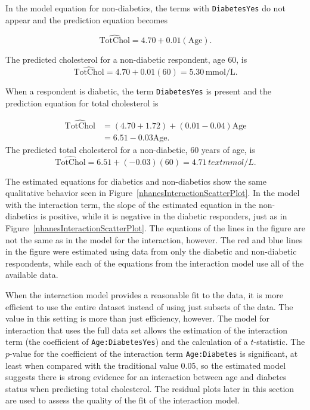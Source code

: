 In the model equation for non-diabetics, the terms with \texttt{DiabetesYes} do not appear and the prediction equation becomes 

\[\widehat{\text{TotChol}} = 4.70 + 0.01(\text{Age}).  \]

The predicted cholesterol for a non-diabetic respondent, age 60, is 
\[\widehat{\text{TotChol}} = 4.70 + 0.01(60) = 5.30\,\text{mmol/L}.  \]

When a respondent is diabetic, the term \texttt{DiabetesYes} is present and the prediction equation for total cholesterol is

\begin{align*}
\widehat{\text{TotChol}} &= (4.70 + 1.72) + (0.01 - 0.04)\text{Age} \\
&= 6.51 - 0.03\text{Age}.
\end{align*}
The predicted total cholesterol for a non-diabetic, 60 years of age, is 
\[\widehat{\text{TotChol}} = 6.51 + (-0.03)(60) = 4.71\, text{mmol/L}.  \]

The estimated equations for diabetics and non-diabetics show the same qualitative behavior seen in Figure~\ref{nhanesInteractionScatterPlot}.  In the model with the interaction term, the slope of the estimated equation in the non-diabetics is positive, while it is negative in the diabetic responders, just as in Figure~\ref{nhanesInteractionScatterPlot}.  The equations of the lines in the figure are not the same as in the model for the interaction, however.  The red and blue lines in the figure were estimated using data from only the diabetic and non-diabetic respondents, while each of the equations from the interaction model use all of the available data.  

When the interaction model provides a reasonable fit to the data, it is more efficient to use the entire dataset instead of using just subsets of the data. The value in this setting is more than just efficiency, however.  The model for interaction that uses the full data set allows the estimation of the interaction term (the coefficient of \texttt{Age:DiabetesYes}) and the calculation of a $t$-statistic. 
The $p$-value for the coefficient of the interaction term \texttt{Age:Diabetes} is significant, at least when compared with the traditional value 0.05, so the estimated model suggests there is strong evidence for an interaction between age and diabetes status when predicting total cholesterol.  The residual plots later in this section are used to assess the quality of the fit of the interaction model.


